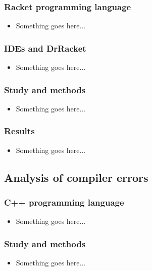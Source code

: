 \documentclass{beamer}
\begin{document}
\begin{frame}
	\frametitle{Racket programming language}
		\begin{itemize}
			\item Something goes here...
		\end{itemize}

\end{frame}

\begin{frame}
	\frametitle{IDEs and DrRacket}
		\begin{itemize}
			\item Something goes here...
		\end{itemize}

\end{frame}

\begin{frame}
	\frametitle{Study and methods}
		\begin{itemize}
			\item Something goes here...
		\end{itemize}

\end{frame}

\begin{frame}
	\frametitle{Results}
		\begin{itemize}
			\item Something goes here...
		\end{itemize}

\end{frame}

\subsection[Compiler Analysis]{Analysis of compiler errors}

\begin{frame}
	\frametitle{C++ programming language}
		\begin{itemize}
			\item Something goes here...
		\end{itemize}

\end{frame}

\begin{frame}
	\frametitle{Study and methods}
		\begin{itemize}
			\item Something goes here...
		\end{itemize}

\end{frame}
\end{document}
